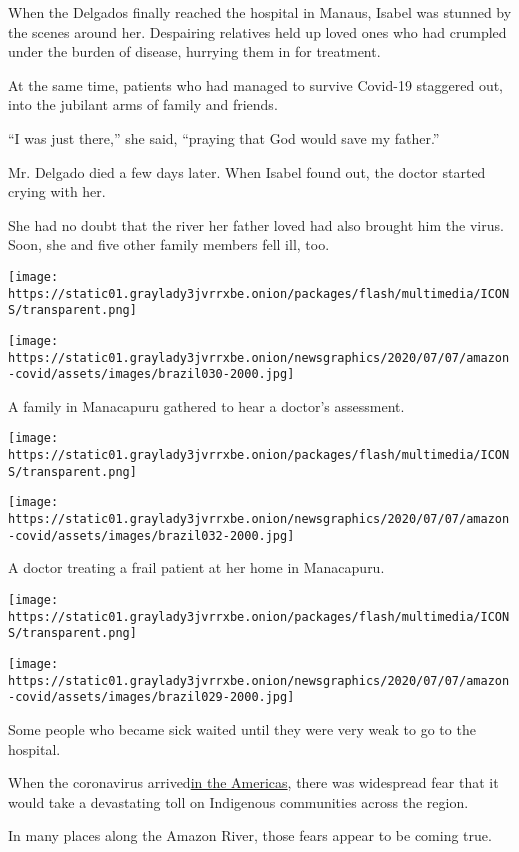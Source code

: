 When the Delgados finally reached the hospital in Manaus, Isabel was
stunned by the scenes around her. Despairing relatives held up loved
ones who had crumpled under the burden of disease, hurrying them in for
treatment.

At the same time, patients who had managed to survive Covid-19 staggered
out, into the jubilant arms of family and friends.

``I was just there,'' she said, ``praying that God would save my
father.''

Mr. Delgado died a few days later. When Isabel found out, the doctor
started crying with her.

She had no doubt that the river her father loved had also brought him
the virus. Soon, she and five other family members fell ill, too.

\texttt{[image: https://static01.graylady3jvrrxbe.onion/packages/flash/multimedia/ICONS/transparent.png]}

\texttt{[image: https://static01.graylady3jvrrxbe.onion/newsgraphics/2020/07/07/amazon-covid/assets/images/brazil030-2000.jpg]}

A family in Manacapuru gathered to hear a doctor's assessment.

\texttt{[image: https://static01.graylady3jvrrxbe.onion/packages/flash/multimedia/ICONS/transparent.png]}

\texttt{[image: https://static01.graylady3jvrrxbe.onion/newsgraphics/2020/07/07/amazon-covid/assets/images/brazil032-2000.jpg]}

A doctor treating a frail patient at her home in Manacapuru.

\texttt{[image: https://static01.graylady3jvrrxbe.onion/packages/flash/multimedia/ICONS/transparent.png]}

\texttt{[image: https://static01.graylady3jvrrxbe.onion/newsgraphics/2020/07/07/amazon-covid/assets/images/brazil029-2000.jpg]}

Some people who became sick waited until they were very weak to go to
the hospital.

When the coronavirus
arrived\href{https://www.nytimes3xbfgragh.onion/2020/07/11/world/americas/coronavirus-latin-america-inequality.html}{}\href{https://www.nytimes3xbfgragh.onion/2020/07/11/world/americas/coronavirus-latin-america-inequality.html}{in
the Americas}, there was widespread fear that it would take a
devastating toll on Indigenous communities across the region.

In many places along the Amazon River, those fears appear to be coming
true.

